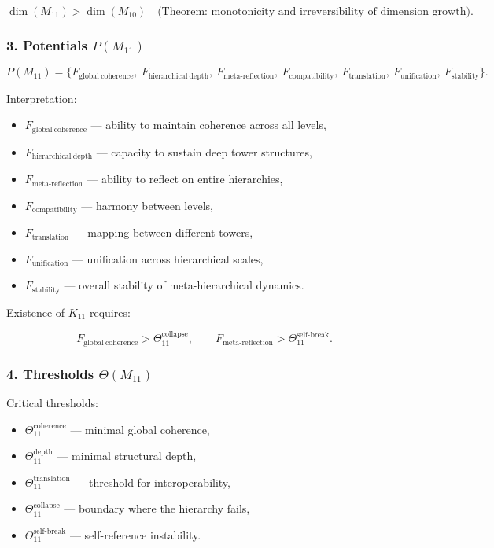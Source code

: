 \[
\dim(M_{11}) > \dim(M_{10})
\quad\text{(Theorem: monotonicity and irreversibility of dimension growth)}.
\]

\subsubsection*{3. Potentials $P(M_{11})$}

\[
P(M_{11}) =
\{
F_{\mathrm{global\ coherence}},\
F_{\mathrm{hierarchical\ depth}},\
F_{\mathrm{meta\mbox{-}reflection}},\
F_{\mathrm{compatibility}},\
F_{\mathrm{translation}},\
F_{\mathrm{unification}},\
F_{\mathrm{stability}}
\}.
\]

Interpretation:

\begin{itemize}
    \item $F_{\mathrm{global\ coherence}}$ — ability to maintain 
        coherence across all levels,
    \item $F_{\mathrm{hierarchical\ depth}}$ — capacity to sustain deep tower structures,
    \item $F_{\mathrm{meta\mbox{-}reflection}}$ — ability to reflect on entire hierarchies,
    \item $F_{\mathrm{compatibility}}$ — harmony between levels,
    \item $F_{\mathrm{translation}}$ — mapping between different towers,
    \item $F_{\mathrm{unification}}$ — unification across hierarchical scales,
    \item $F_{\mathrm{stability}}$ — overall stability of meta-hierarchical dynamics.
\end{itemize}

Existence of $K_{11}$ requires:

\[
F_{\mathrm{global\ coherence}} > \Theta_{11}^{\mathrm{collapse}},
\qquad
F_{\mathrm{meta\mbox{-}reflection}} > \Theta_{11}^{\mathrm{self\mbox{-}break}}.
\]

\subsubsection*{4. Thresholds $\Theta(M_{11})$}

Critical thresholds:

\begin{itemize}
    \item $\Theta_{11}^{\mathrm{coherence}}$ — minimal global coherence,
    \item $\Theta_{11}^{\mathrm{depth}}$ — minimal structural depth,
    \item $\Theta_{11}^{\mathrm{translation}}$ — threshold for interoperability,
    \item $\Theta_{11}^{\mathrm{collapse}}$ — boundary where the hierarchy fails,
    \item $\Theta_{11}^{\mathrm{self\mbox{-}break}}$ — self-reference instability.
\end{itemize}

